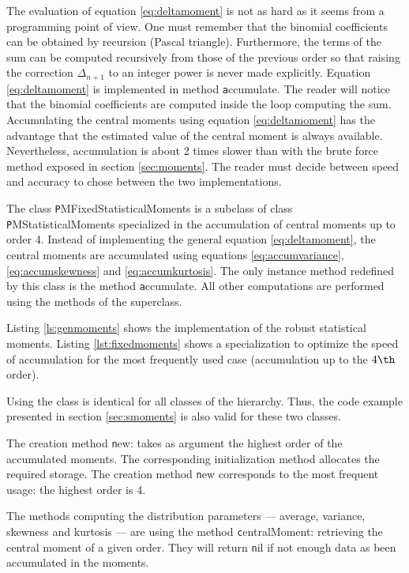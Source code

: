The evaluation of equation \ref{eq:deltamoment} is not as hard as
it seems from a programming point of view.
One must remember that the binomial coefficients can be obtained by recursion (Pascal
triangle).
Furthermore, the terms of the sum can be computed recursively from those of the
previous order so that raising the correction $\Delta_{n+1}$ to an integer power
is never made explicitly.
Equation \ref{eq:deltamoment} is implemented in method {\texttt accumulate}. The
reader will notice that the binomial coefficients are computed inside the loop
computing the sum.
Accumulating the central moments using equation \ref{eq:deltamoment} has the
advantage that the estimated value of the central moment is always available.
Nevertheless, accumulation is about 2 times slower than with the brute force
method exposed in section \ref{sec:moments}.
The reader must decide between speed and accuracy to chose between the two implementations.

The class {\texttt PMFixedStatisticalMoments} is a subclass of class
{\texttt PMStatisticalMoments} specialized in the accumulation of
central moments up to order 4.
Instead of implementing the general equation \ref{eq:deltamoment}, the central
moments are accumulated using equations \ref{eq:accumvariance},
\ref{eq:accumskewness} and \ref{eq:accumkurtosis}.
The only instance method redefined by this
class is the method {\texttt accumulate}.
All other computations are performed using the methods of the superclass.

\label{sec:srobustmoment} Listing
\ref{ls:genmoments} shows the implementation of the robust
statistical moments. Listing \ref{lst:fixedmoments} shows a
specialization to optimize the speed of accumulation for the most
frequently used case (accumulation up to the $4\th$ order).

Using the class is identical for all classes of the hierarchy.
Thus, the code example presented in section \ref{sec:smoments} is
also valid for these two classes.

The creation method {\texttt new:} takes as argument the highest order of the accumulated moments.
The corresponding initialization method allocates the required storage.
The creation method {\texttt new} corresponds to the most frequent usage: the highest order is
4.

The methods computing the distribution parameters --- average,
variance, skewness and kurtosis --- are using the method {\texttt
centralMoment:} retrieving the central moment of a given order.
They will return {\texttt nil} if not enough data as been accumulated
in the moments.

